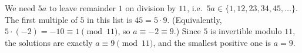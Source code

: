 We need $5a$ to leave remainder $1$ on division by $11$, i.e.\ $5a\in\{1,12,23,34,45,\dots\}$. The first multiple of $5$ in this list is $45=5\cdot9$. (Equivalently, $5\cdot(-2)=-10\equiv1\pmod{11}$, so $a\equiv-2\equiv9$.) Since $5$ is invertible modulo $11$, the solutions are exactly $a\equiv9\pmod{11}$, and the smallest positive one is $a=\boxed{9}$.
